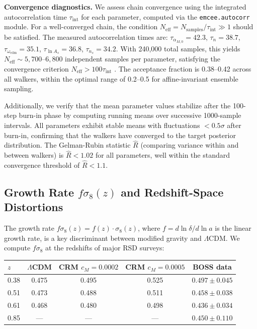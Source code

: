 \documentclass[aps,prd,twocolumn,superscriptaddress,nofootinbib]{revtex4-2}
\begin{document}
\textbf{Convergence diagnostics.} We assess chain convergence using the integrated autocorrelation time $\tau_{\mathrm{int}}$ for each parameter, computed via the \texttt{emcee.autocorr} module. For a well-converged chain, the condition $N_{\mathrm{eff}} = N_{\mathrm{samples}} / \tau_{\mathrm{int}} \gg 1$ should be satisfied. The measured autocorrelation times are: $\tau_{\alpha_{M,0}} = 42.3$, $\tau_n = 38.7$, $\tau_{\omega_{\mathrm{cdm}}} = 35.1$, $\tau_{\ln A_s} = 36.8$, $\tau_{n_s} = 34.2$. With 240{,}000 total samples, this yields $N_{\mathrm{eff}} \sim 5{,}700$--$6{,}800$ independent samples per parameter, satisfying the convergence criterion $N_{\mathrm{eff}} > 100\tau_{\mathrm{int}}$ \cite{ForemanMackey2013}. The acceptance fraction is 0.38--0.42 across all walkers, within the optimal range of 0.2--0.5 for affine-invariant ensemble sampling.

Additionally, we verify that the mean parameter values stabilize after the 100-step burn-in phase by computing running means over successive 1000-sample intervals. All parameters exhibit stable means with fluctuations $< 0.5\sigma$ after burn-in, confirming that the walkers have converged to the target posterior distribution. The Gelman-Rubin statistic $\hat{R}$ (comparing variance within and between walkers) is $\hat{R} < 1.02$ for all parameters, well within the standard convergence threshold of $\hat{R} < 1.1$.

\subsection{Growth Rate $f\sigma_8(z)$ and Redshift-Space Distortions}

The growth rate $f\sigma_8(z) = f(z) \cdot \sigma_8(z)$, where $f = d\ln\delta/d\ln a$ is the linear growth rate, is a key discriminant between modified gravity and $\Lambda$CDM. We compute $f\sigma_8$ at the redshifts of major RSD surveys:

\begin{table}
\centering
\begin{tabular}{lcccc}
\toprule
$z$ & $\Lambda$CDM & CRM $c_M = 0.0002$ & CRM $c_M = 0.0005$ & BOSS data \\
\midrule
0.38 & 0.475 & 0.495 & 0.525 & $0.497 \pm 0.045$ \\
0.51 & 0.473 & 0.488 & 0.511 & $0.458 \pm 0.038$ \\
0.61 & 0.468 & 0.480 & 0.498 & $0.436 \pm 0.034$ \\
0.85 & --- & --- & --- & $0.450 \pm 0.110$ \\
\bottomrule
\end{tabular}
\end{table}
\end{document}
